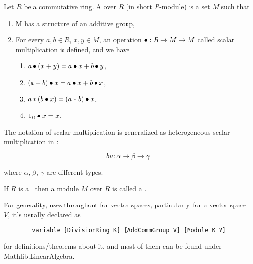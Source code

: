 \begin{definition}[Module]
    \label{Module}
    \leanok

    Let $R$ be a commutative ring. A  over $R$ (in short $R$-module) is a set $M$ such that

    \begin{enumerate}
      \item M has a structure of an additive group,
    
      \item For every $a, b \in R$, $x, y \in M$, an operation $\bullet : R \to M \to M$ called scalar multiplication is defined, and we have
      
        \begin{enumerate}[i]
            \item $a \bullet (x + y) = a \bullet x + b \bullet y$,
            \item $(a + b) \bullet x = a \bullet x + b \bullet x$,
            \item $a * (b \bullet x)=(a * b) \bullet x$,
            \item $1_R \bullet x = x$.
        \end{enumerate}
    \end{enumerate}

\end{definition}

\begin{remark}
    \label{mk:Module}

    The notation of scalar multiplication is generalized as heterogeneous scalar multiplication in \Mathlib:

    $$
    bu : \alpha \to \beta \to \gamma
    $$

    where $\alpha$, $\beta$, $\gamma$ are different types.
    
\end{remark}

\begin{definition}
    \label{VectorSpace}
    \leanok

    If $R$ is a , then a module $M$ over $R$ is called a .

\end{definition}

\begin{remark}
    \label{mk:VectorSpace}

    For generality, \Mathlib uses  throughout for vector spaces,
    particularly, for a vector space $V$, it's usually declared as

    \begin{lstlisting}
        variable [DivisionRing K] [AddCommGroup V] [Module K V]
    \end{lstlisting}

    for definitions/theorems about it, and most of them can be found under \textsf{Mathlib.LinearAlgebra}. %
    
\end{remark}

